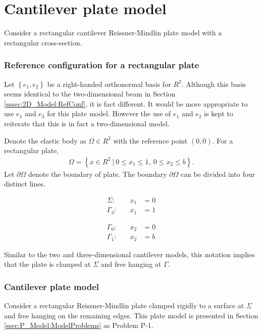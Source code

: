 \documentclass[../../main.tex]{subfiles}
\begin{document}
\section{Cantilever plate model}\label{sec:FEM:Plate}
Consider a rectangular cantilever Reissner-Mindlin plate model with a rectangular cross-section.

\subsubsection{Reference configuration for a rectangular plate}
Let $\left\{e_1,e_2\right\}$ be a right-handed orthonormal basis for $R^2$. Although this basis seems identical to the two-dimensional beam in Section \ref{sssec:2D_Model:RefConf}, it is fact different. It would be more appropriate to use $e_1$ and $e_3$ for this plate model. However the use of $e_1$ and $e_2$ is kept to reiterate that this is in fact a two-dimensional model.

Denote the elastic body as $\Omega \in R^2$ with the reference point $(0,0)$. For a rectangular plate,
\begin{eqnarray*}
	\Omega = \left \{ x \in R^2 \ | \ 0 \leq x_1 \leq 1, \ 0 \leq x_2 \leq b \right \}.
\end{eqnarray*}
Let $\partial \Omega$ denote the boundary of plate. The boundary $\partial \Omega$ can be divided into four distinct lines.

\noindent\begin{minipage}{.5\linewidth}
	\begin{eqnarray*}
		\Sigma:& \quad x_1 &= 0\\
		\Gamma_3:& \quad x_1 &= 1
	\end{eqnarray*}
\end{minipage}%
\begin{minipage}{.5\linewidth}
	\begin{eqnarray*}
		\Gamma_0:& \quad x_2 &= 0\\
		\Gamma_1:& \quad x_2 &= b
	\end{eqnarray*}
\end{minipage}

Similar to the two and three-dimensional cantilever models, this notation implies that the plate is clamped at $\Sigma$ and free hanging at $\Gamma$.

\subsubsection{Cantilever plate model}
Consider a rectangular Reissner-Mindlin plate clamped rigidly to a surface at $\Sigma$ and free hanging on the remaining edges. This plate model is presented in Section \ref{ssec:P_Model:ModelProblems} as Problem P-1.
\end{document}
